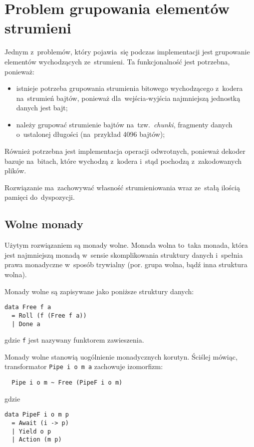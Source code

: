 \documentclass[../../thesis.tex]{subfiles}
\begin{document}
\section{Problem grupowania elementów strumieni}

Jednym z~problemów, który pojawia~się podczas implementacji jest grupowanie elementów
wychodzących ze~strumieni. Ta funkcjonalność jest potrzebna, ponieważ:
\begin{itemize}
  \item istnieje potrzeba grupowania strumienia bitowego wychodzącego z~kodera
    na~strumień bajtów, ponieważ dla~wejścia-wyjścia najmniejszą jednostką danych
    jest bajt;
  \item należy grupować strumienie bajtów na~tzw.~\emph{chunki}, fragmenty
    danych o~ustalonej długości (na~przykład 4096 bajtów);
\end{itemize}
Również potrzebna jest implementacja operacji odwrotnych, ponieważ dekoder
bazuje na~bitach, które wychodzą z~kodera i~stąd pochodzą z~zakodowanych plików.

Rozwiązanie ma~zachowywać własność strumieniowania wraz ze~stałą ilością pamięci
do~dyspozycji.

\subsection{Wolne monady}

Użytym rozwiązaniem są monady wolne. Monada wolna to~taka monada, która
jest najmniejszą monadą w~sensie skomplikowania struktury danych i~spełnia 
prawa monadyczne w~sposób trywialny (por. grupa wolna, bądź
inna struktura wolna).

Monady wolne są zapisywane jako poniższe struktury danych:
\begin{verbatim}
data Free f a
  = Roll (f (Free f a))
  | Done a
\end{verbatim}
gdzie \texttt{f} jest nazywany funktorem zawieszenia.

Monady wolne stanowią uogólnienie monadycznych korutyn. Ściślej mówiąc,
transformator \texttt{Pipe i o m a} zachowuje izomorfizm:

\begin{verbatim}
  Pipe i o m ~ Free (PipeF i o m)
\end{verbatim}
gdzie
\begin{verbatim}
data PipeF i o m p
  = Await (i -> p)
  | Yield o p
  | Action (m p)
\end{verbatim}
\end{document}
